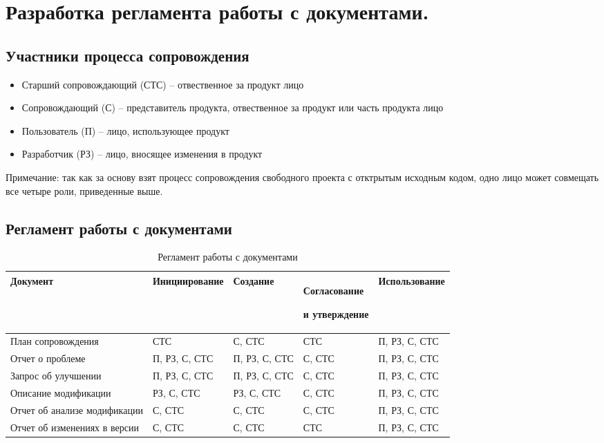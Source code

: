 
\pagebreak


\section{Разработка регламента работы с документами.}

\subsection{Участники процесса сопровождения}

\begin{itemize}
    \item Старший сопровождающий (СТС) -- отвественное за продукт лицо
    \item Сопровождающий (С) -- представитель продукта, отвественное за продукт или часть продукта лицо
    \item Пользователь (П) -- лицо, использующее продукт
    \item Разработчик (РЗ) -- лицо, вносящее изменения в продукт
\end{itemize}

Примечание: так как за основу взят процесс сопровождения свободного проекта с отктрытым исходным кодом, одно лицо может совмещать все четыре роли, приведенные выше.

\subsection{Регламент работы с документами}

\begin{center}
    \begin{longtable}{|p{3cm}|p{3.3cm}|p{3cm}|p{3cm}|p{3cm}|}
        \caption{Регламент работы с документами} \\
        \hline
        Документ                     & Инициирование & Создание      & Согласование \par и утверждение & Использование \\
        \hline
        План сопровождения           & СТС           & С, СТС        & СТС                             & П, РЗ, С, СТС \\
        \hline
        Отчет о проблеме             & П, РЗ, С, СТС & П, РЗ, С, СТС & С, СТС                          & П, РЗ, С, СТС \\
        \hline
        Запрос об улучшении          & П, РЗ, С, СТС & П, РЗ, С, СТС & С, СТС                          & П, РЗ, С, СТС \\
        \hline
        Описание модификации         & РЗ, С, СТС    & РЗ, С, СТС    & С, СТС                          & П, РЗ, С, СТС \\
        \hline
        Отчет об анализе модификации & С, СТС        & С, СТС        & С, СТС                          & П, РЗ, С, СТС \\
        \hline
        Отчет об изменениях в версии & С, СТС        & С, СТС        & СТС                             & П, РЗ, С, СТС \\
        \hline
    \end{longtable}
\end{center}